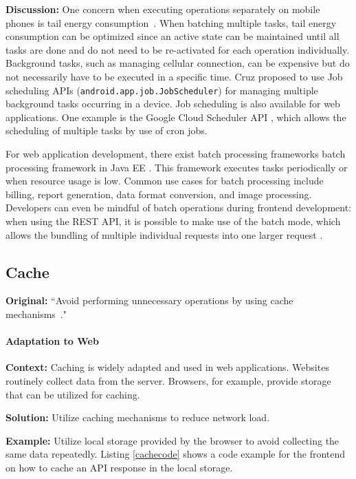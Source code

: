 \textbf{Discussion:} One concern when executing operations separately on mobile phones is tail energy consumption~\cite{cruz2019catalog}. When batching multiple tasks, tail energy consumption can be optimized since an active state can be maintained until all tasks are done and do not need to be re-activated for each operation individually. Background tasks, such as managing cellular connection, can be expensive but do not necessarily have to be executed in a specific time. Cruz \etal proposed to use Job scheduling APIs (\eg \texttt{android.app.job.JobScheduler}) for managing multiple background tasks occurring in a device. Job scheduling is also available for web applications. One example is the Google Cloud Scheduler API \cite{Google-cloude-scheduler-api}, which allows the scheduling of multiple tasks by use of cron jobs.

For web application development, there exist batch processing frameworks \eg batch processing framework in Java EE \cite{javaee-batch-processing}. This framework executes tasks periodically or when resource usage is low.
Common use cases for batch processing include billing, report generation, data format conversion, and image processing. Developers can even be mindful of batch operations during frontend development: when using the REST API, it is possible to make use of the batch mode, which allows the bundling of multiple individual requests into one larger request \cite{rest-api-batch-example} \cite{MicrosoftAPI}.


\subsection{Cache} \label{sec:patterns-Cache}
\textbf{Original:} ``Avoid performing unnecessary operations by using cache mechanisms~\cite{cruz2019catalog}."

\paragraph{Adaptation to Web}\mbox{}

\textbf{Context:} Caching is widely adapted and used in web applications. Websites routinely collect data from the server. Browsers, for example, provide storage that can be utilized for caching.

\textbf{Solution:} Utilize caching mechanisms to reduce network load.

\textbf{Example:} Utilize local storage provided by the browser to avoid collecting the same data repeatedly. Listing \ref{cachecode} shows a code example for the frontend on how to cache an API response in the local storage.

